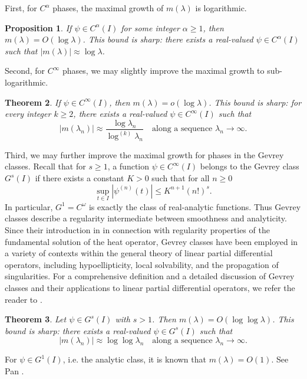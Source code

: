 \documentclass[11pt]{amsart}
\newtheorem{theorem}{Theorem}[section]
\newtheorem{proposition}[theorem]{Proposition}
\newcommand{\la}{\lambda}
\newcommand{\1}{{\rm 1\hspace*{-0.4ex}%
			\rule{0.1ex}{1.52ex}\hspace*{0.2ex}}}
\numberwithin{equation}{section}
\newcommand{\logit}[1]{\log^{(#1)}}
\begin{document}
First, for $C^\alpha$ phases, the maximal growth of $m(\la)$ is logarithmic. 

\begin{proposition}\label{prop0}
	If $\psi\in C^\alpha(I)$ for some integer $\alpha\ge1$, then $m(\la)=O(\log\la)$. This bound is sharp: there exists a real-valued $\psi\in C^\alpha(I)$ such that $|m(\la)|\approx \log\la$.
\end{proposition}

Second, for $C^\infty$ phases, we may slightly improve the maximal growth to sub-logarithmic.
\begin{theorem}\label{thm:main0}
	If $\psi\in C^\infty(I)$, then $m(\la)=o(\log\la)$. This bound is sharp: for every integer $k\ge 2$, there exists a real-valued $\psi\in C^\infty(I)$ such that
	\[
	|m(\lambda_n)|\approx \frac{\log \lambda_n}{\logit{k}\lambda_n}	\quad\text{along a sequence }\lambda_n\to\infty.
	\]
\end{theorem}

Third, we may further improve the maximal growth for phases in the Gevrey classes. Recall that for $s\ge1$, a function $\psi\in C^\infty(I)$ belongs to the Gevrey class
$G^s(I)$ if there exists a constant $K>0$ such that for all $n\ge0$
\[
\sup_{t\in I} |\psi^{(n)}(t)|
\le K^{n+1} (n!)^s.
\]
In particular, $G^1=C^\omega$ is exactly the class of real-analytic functions. Thus Gevrey classes describe a regularity intermediate between smoothness and analyticity. Since their introduction in \cite{gev} in connection with regularity properties of the fundamental solution of the heat operator, Gevrey classes have been employed in a variety of contexts within the general theory of linear partial differential operators, including hypoellipticity, local solvability, and the propagation of singularities. For a comprehensive definition and a detailed discussion of Gevrey classes and their applications to linear partial differential operators, we refer the reader to \cite{rod93}.
\begin{theorem}\label{thm:main1}
	Let $\psi\in G^s(I)$ with $s>1$. Then $m(\la)=O(\log\log\la)$. 
	This bound is sharp: there exists a real-valued $\psi\in G^s(I)$ such that
	\[
	|m(\lambda_n)| \approx \log\log \lambda_n
	\quad\text{along a sequence }\lambda_n\to\infty.
	\]
\end{theorem}
For $\psi\in G^1(I)$, i.e. the analytic class, it is known that $m(\la)=O(1)$. See Pan \cite{pan93}.
\end{document}
